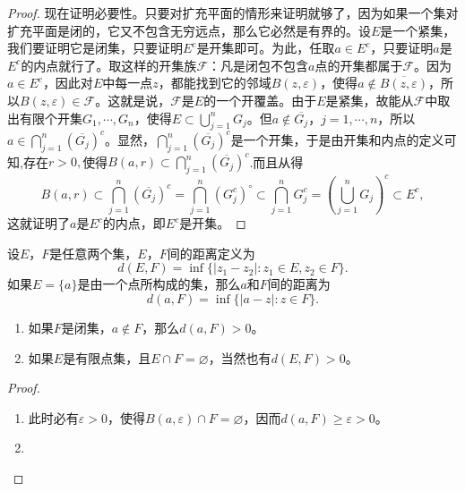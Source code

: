 \documentclass[../../main.tex]{subfiles}
\begin{document}
\begin{proof}
现在证明必要性。只要对扩充平面的情形来证明就够了，因为如果一个集对扩充平面是闭的，它又不包含无穷远点，那么它必然是有界的。设\(E\)是一个紧集，我们要证明它是闭集，只要证明\(E^c\)是开集即可。为此，任取\(a \in E^c\)，只要证明\(a\)是\(E^c\)的内点就行了。取这样的开集族\(\mathscr{F}\)：凡是闭包不包含\(a\)点的开集都属于\(\mathscr{F}\)。因为\(a \in E^c\)，因此对\(E\)中每一点\(z\)，都能找到它的邻域\(B(z, \varepsilon)\)，使得\(a \notin \overline{B(z, \varepsilon)}\)，所以\(B(z, \varepsilon) \in \mathscr{F}\)。这就是说，\(\mathscr{F}\)是\(E\)的一个开覆盖。由于\(E\)是紧集，故能从\(\mathscr{F}\)中取出有限个开集\(G_1, \cdots, G_n\)，使得\(E \subset \bigcup_{j = 1}^n G_j\)。但\(a \notin \overline{G_j}\)，\(j = 1, \cdots, n\)，所以\(a \in \bigcap_{j = 1}^n (\overline{G_j})^c\)。显然，\(\bigcap_{j = 1}^n (\overline{G_j})^c\)是一个开集，于是由开集和内点的定义可知,存在$r>0,$使得$B(a,r)\subset \bigcap_{j = 1}^n (\overline{G_j})^c$.而且从得
\[
B(a,r)\subset \bigcap_{j = 1}^n (\overline{G_j})^c = \bigcap_{j = 1}^n (G_j^c)^\circ \subset \bigcap_{j = 1}^n G_j^c = \left( \bigcup_{j = 1}^n G_j \right)^c \subset E^c,
\]
这就证明了\(a\)是\(E^c\)的内点，即\(E^c\)是开集。

\end{proof}

\begin{definition}
设\(E\)，\(F\)是任意两个集，\(E\)，\(F\)间的距离定义为
\[
d(E, F) = \inf\{ | z_1 - z_2 | : z_1 \in E, z_2 \in F \}.
\]
如果\(E = \{ a \}\)是由一个点所构成的集，那么\(a\)和\(F\)间的距离为
\[
d(a, F) = \inf\{ | a - z | : z \in F \}.
\]
\end{definition}

\begin{proposition}
\begin{enumerate}[(1)]
\item 如果\(F\)是闭集，\(a \notin F\)，那么\(d(a, F) > 0\)。

\item 如果\(E\)是有限点集，且\(E \cap F = \varnothing\)，当然也有\(d(E, F) > 0\)。
\end{enumerate}
\end{proposition}
\begin{proof}
\begin{enumerate}[(1)]
\item 此时必有\(\varepsilon > 0\)，使得\(B(a, \varepsilon) \cap F = \varnothing\)，因而\(d(a, F) \geqslant \varepsilon > 0\)。

\item 
\end{enumerate}

\end{proof}
\end{document}
